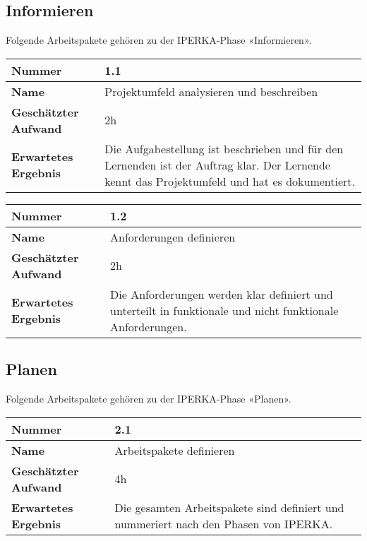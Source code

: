 \subsection{Informieren}
Folgende Arbeitspakete gehören zu der IPERKA-Phase «Informieren».

\begin{longtable}{p{}|p{}}
	\hline
	\textbf{Nummer}                 & \textbf{1.1}            \\
	\hline
	\textbf{Name}   				& Projektumfeld analysieren und beschreiben                  \\
	\hline
	\textbf{Geschätzter Aufwand}    & 2h                                    \\
	\hline
	\textbf{Erwartetes Ergebnis}    & Die Aufgabestellung ist beschrieben und für den Lernenden ist der Auftrag klar. Der Lernende kennt das Projektumfeld und hat es dokumentiert.                                    \\
	\hline
\end{longtable}\label{tab:informieren-1.1}

\begin{longtable}{p{}|p{}}
	\hline
	\textbf{Nummer}                 & \textbf{1.2}            \\
	\hline
	\textbf{Name}   				& Anforderungen definieren                  \\
	\hline
	\textbf{Geschätzter Aufwand}    & 2h                                    \\
	\hline
	\textbf{Erwartetes Ergebnis}    & Die Anforderungen werden klar definiert und unterteilt in funktionale und nicht funktionale Anforderungen.                                    \\
	\hline
\end{longtable}\label{tab:informieren-1.2}

\subsection{Planen}
Folgende Arbeitspakete gehören zu der IPERKA-Phase «Planen».

\begin{longtable}{p{}|p{}}
	\hline
	\textbf{Nummer}                 & \textbf{2.1}            \\
	\hline
	\textbf{Name}   				& Arbeitspakete definieren                  \\
	\hline
	\textbf{Geschätzter Aufwand}    & 4h                                    \\
	\hline
	\textbf{Erwartetes Ergebnis}    & Die gesamten Arbeitspakete sind definiert und nummeriert nach den Phasen von IPERKA.                                    \\
	\hline
\end{longtable}\label{tab:planen-2.1}

